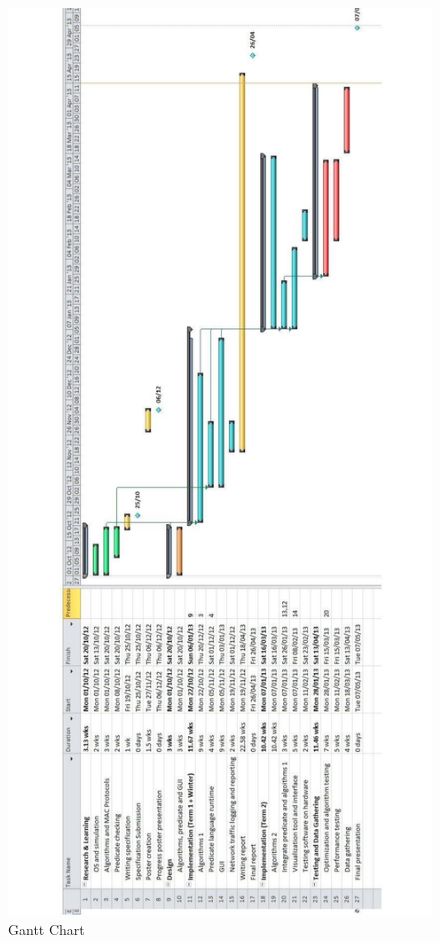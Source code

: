 \begin{figure}[H]
\centering
\includegraphics[height=.99\textheight]{Images/pm-gantt.pdf}
\caption{Gantt Chart}
\label{fig:Gantt Chart of project}
\end{figure}

